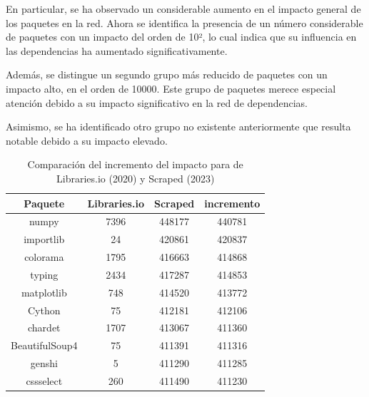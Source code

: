 En particular, se ha observado un considerable aumento en el impacto general de los paquetes en la
red. Ahora se identifica la presencia de un número considerable de paquetes con un impacto del orden
de 10², lo cual indica que su influencia en las dependencias ha aumentado
significativamente.

Además, se distingue un segundo grupo más reducido de paquetes con un impacto alto, en el orden de 10000.
Este grupo de paquetes merece especial atención debido a su impacto significativo
en la red de dependencias.

Asimismo, se ha identificado otro grupo no existente anteriormente que resulta notable debido a
su impacto elevado.

\begin{table}[ht!]
    \centering
    \caption{Comparación del incremento del impacto para de Libraries.io (2020) y Scraped (2023)}
    \begin{tabular}{|c|c|c|c|}
        \hline
        \textbf{Paquete} & \textbf{Libraries.io} & \textbf{Scraped} & \textbf{incremento} \\
        \hline
        numpy            & 7396                  & 448177           & 440781              \\
        importlib        & 24                    & 420861           & 420837              \\
        colorama         & 1795                  & 416663           & 414868              \\
        typing           & 2434                  & 417287           & 414853              \\
        matplotlib       & 748                   & 414520           & 413772              \\
        Cython           & 75                    & 412181           & 412106              \\
        chardet          & 1707                  & 413067           & 411360              \\
        BeautifulSoup4   & 75                    & 411391           & 411316              \\
        genshi           & 5                     & 411290           & 411285              \\
        cssselect        & 260                   & 411490           & 411230              \\
        \hline
    \end{tabular}
    \label{tab:Comparación del incremento del impacto para de Libraries.io (2020) y Scraped (2023)}
\end{table}

